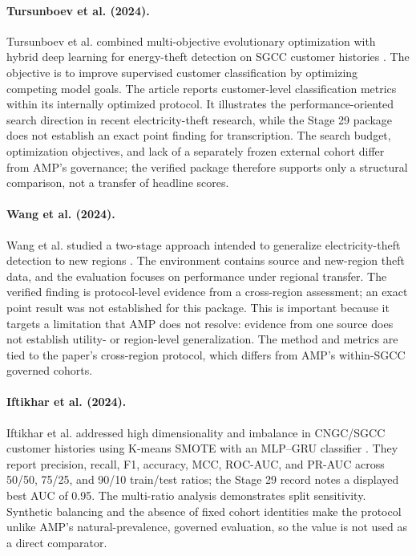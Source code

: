\paragraph{Tursunboev et al. (2024).}
Tursunboev et al. combined multi-objective evolutionary optimization with hybrid deep learning for energy-theft detection on SGCC customer histories \cite{Tursunboev2024MultiObjective}. The objective is to improve supervised customer classification by optimizing competing model goals. The article reports customer-level classification metrics within its internally optimized protocol. It illustrates the performance-oriented search direction in recent electricity-theft research, while the Stage 29 package does not establish an exact point finding for transcription. The search budget, optimization objectives, and lack of a separately frozen external cohort differ from AMP's governance; the verified package therefore supports only a structural comparison, not a transfer of headline scores.

\paragraph{Wang et al. (2024).}
Wang et al. studied a two-stage approach intended to generalize electricity-theft detection to new regions \cite{Wang2024NewRegions}. The environment contains source and new-region theft data, and the evaluation focuses on performance under regional transfer. The verified finding is protocol-level evidence from a cross-region assessment; an exact point result was not established for this package. This is important because it targets a limitation that AMP does not resolve: evidence from one source does not establish utility- or region-level generalization. The method and metrics are tied to the paper's cross-region protocol, which differs from AMP's within-SGCC governed cohorts.

\paragraph{Iftikhar et al. (2024).}
Iftikhar et al. addressed high dimensionality and imbalance in CNGC/SGCC customer histories using K-means SMOTE with an MLP--GRU classifier \cite{Iftikhar2024MLPGRU}. They report precision, recall, F1, accuracy, MCC, ROC-AUC, and PR-AUC across 50/50, 75/25, and 90/10 train/test ratios; the Stage 29 record notes a displayed best AUC of 0.95. The multi-ratio analysis demonstrates split sensitivity. Synthetic balancing and the absence of fixed cohort identities make the protocol unlike AMP's natural-prevalence, governed evaluation, so the value is not used as a direct comparator.

